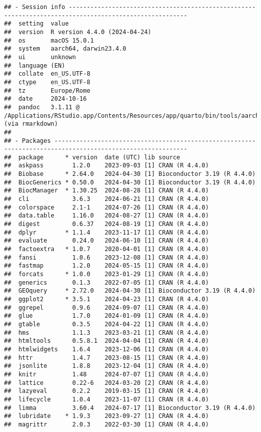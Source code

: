 \documentclass[
]{article}
\begin{document}
\begin{verbatim}
## - Session info -------------------------------------------------------------------------------------------------------
##  setting  value
##  version  R version 4.4.0 (2024-04-24)
##  os       macOS 15.0.1
##  system   aarch64, darwin23.4.0
##  ui       unknown
##  language (EN)
##  collate  en_US.UTF-8
##  ctype    en_US.UTF-8
##  tz       Europe/Rome
##  date     2024-10-16
##  pandoc   3.1.11 @ /Applications/RStudio.app/Contents/Resources/app/quarto/bin/tools/aarch64/ (via rmarkdown)
## 
## - Packages -----------------------------------------------------------------------------------------------------------
##  package      * version  date (UTC) lib source
##  askpass        1.2.0    2023-09-03 [1] CRAN (R 4.4.0)
##  Biobase      * 2.64.0   2024-04-30 [1] Bioconductor 3.19 (R 4.4.0)
##  BiocGenerics * 0.50.0   2024-04-30 [1] Bioconductor 3.19 (R 4.4.0)
##  BiocManager  * 1.30.25  2024-08-28 [1] CRAN (R 4.4.0)
##  cli            3.6.3    2024-06-21 [1] CRAN (R 4.4.0)
##  colorspace     2.1-1    2024-07-26 [1] CRAN (R 4.4.0)
##  data.table     1.16.0   2024-08-27 [1] CRAN (R 4.4.0)
##  digest         0.6.37   2024-08-19 [1] CRAN (R 4.4.0)
##  dplyr        * 1.1.4    2023-11-17 [1] CRAN (R 4.4.0)
##  evaluate       0.24.0   2024-06-10 [1] CRAN (R 4.4.0)
##  factoextra   * 1.0.7    2020-04-01 [1] CRAN (R 4.4.0)
##  fansi          1.0.6    2023-12-08 [1] CRAN (R 4.4.0)
##  fastmap        1.2.0    2024-05-15 [1] CRAN (R 4.4.0)
##  forcats      * 1.0.0    2023-01-29 [1] CRAN (R 4.4.0)
##  generics       0.1.3    2022-07-05 [1] CRAN (R 4.4.0)
##  GEOquery     * 2.72.0   2024-04-30 [1] Bioconductor 3.19 (R 4.4.0)
##  ggplot2      * 3.5.1    2024-04-23 [1] CRAN (R 4.4.0)
##  ggrepel        0.9.6    2024-09-07 [1] CRAN (R 4.4.0)
##  glue           1.7.0    2024-01-09 [1] CRAN (R 4.4.0)
##  gtable         0.3.5    2024-04-22 [1] CRAN (R 4.4.0)
##  hms            1.1.3    2023-03-21 [1] CRAN (R 4.4.0)
##  htmltools      0.5.8.1  2024-04-04 [1] CRAN (R 4.4.0)
##  htmlwidgets    1.6.4    2023-12-06 [1] CRAN (R 4.4.0)
##  httr           1.4.7    2023-08-15 [1] CRAN (R 4.4.0)
##  jsonlite       1.8.8    2023-12-04 [1] CRAN (R 4.4.0)
##  knitr          1.48     2024-07-07 [1] CRAN (R 4.4.0)
##  lattice        0.22-6   2024-03-20 [2] CRAN (R 4.4.0)
##  lazyeval       0.2.2    2019-03-15 [1] CRAN (R 4.4.0)
##  lifecycle      1.0.4    2023-11-07 [1] CRAN (R 4.4.0)
##  limma          3.60.4   2024-07-17 [1] Bioconductor 3.19 (R 4.4.0)
##  lubridate    * 1.9.3    2023-09-27 [1] CRAN (R 4.4.0)
##  magrittr       2.0.3    2022-03-30 [1] CRAN (R 4.4.0)

\end{verbatim}
\end{document}
